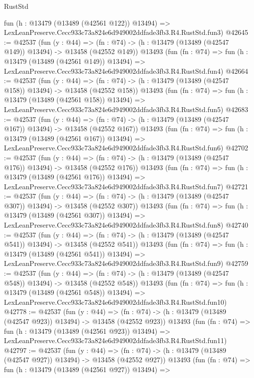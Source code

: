 \begin{lexlean}{RustStd}
\begin{coremodule}
    fun (h : @13479 (@13489 (@42561 @122)) @13494) =>
    LexLeanPreserve.Cecc933c73a824e6d949002ddfade3fb3.R4.RustStd.fun3)
@42645 := @42537
    (fun (y : @44) =>
    (fn : @74) -> (h : @13479 (@13489 (@42547 @149)) @13494) -> @13458 (@42552 @149))
    @13493
    (fun (fn : @74) =>
    fun (h : @13479 (@13489 (@42561 @149)) @13494) =>
    LexLeanPreserve.Cecc933c73a824e6d949002ddfade3fb3.R4.RustStd.fun4)
@42664 := @42537
    (fun (y : @44) =>
    (fn : @74) -> (h : @13479 (@13489 (@42547 @158)) @13494) -> @13458 (@42552 @158))
    @13493
    (fun (fn : @74) =>
    fun (h : @13479 (@13489 (@42561 @158)) @13494) =>
    LexLeanPreserve.Cecc933c73a824e6d949002ddfade3fb3.R4.RustStd.fun5)
@42683 := @42537
    (fun (y : @44) =>
    (fn : @74) -> (h : @13479 (@13489 (@42547 @167)) @13494) -> @13458 (@42552 @167))
    @13493
    (fun (fn : @74) =>
    fun (h : @13479 (@13489 (@42561 @167)) @13494) =>
    LexLeanPreserve.Cecc933c73a824e6d949002ddfade3fb3.R4.RustStd.fun6)
@42702 := @42537
    (fun (y : @44) =>
    (fn : @74) -> (h : @13479 (@13489 (@42547 @176)) @13494) -> @13458 (@42552 @176))
    @13493
    (fun (fn : @74) =>
    fun (h : @13479 (@13489 (@42561 @176)) @13494) =>
    LexLeanPreserve.Cecc933c73a824e6d949002ddfade3fb3.R4.RustStd.fun7)
@42721 := @42537
    (fun (y : @44) =>
    (fn : @74) -> (h : @13479 (@13489 (@42547 @307)) @13494) -> @13458 (@42552 @307))
    @13493
    (fun (fn : @74) =>
    fun (h : @13479 (@13489 (@42561 @307)) @13494) =>
    LexLeanPreserve.Cecc933c73a824e6d949002ddfade3fb3.R4.RustStd.fun8)
@42740 := @42537
    (fun (y : @44) =>
    (fn : @74) -> (h : @13479 (@13489 (@42547 @541)) @13494) -> @13458 (@42552 @541))
    @13493
    (fun (fn : @74) =>
    fun (h : @13479 (@13489 (@42561 @541)) @13494) =>
    LexLeanPreserve.Cecc933c73a824e6d949002ddfade3fb3.R4.RustStd.fun9)
@42759 := @42537
    (fun (y : @44) =>
    (fn : @74) -> (h : @13479 (@13489 (@42547 @548)) @13494) -> @13458 (@42552 @548))
    @13493
    (fun (fn : @74) =>
    fun (h : @13479 (@13489 (@42561 @548)) @13494) =>
    LexLeanPreserve.Cecc933c73a824e6d949002ddfade3fb3.R4.RustStd.fun10)
@42778 := @42537
    (fun (y : @44) =>
    (fn : @74) -> (h : @13479 (@13489 (@42547 @923)) @13494) -> @13458 (@42552 @923))
    @13493
    (fun (fn : @74) =>
    fun (h : @13479 (@13489 (@42561 @923)) @13494) =>
    LexLeanPreserve.Cecc933c73a824e6d949002ddfade3fb3.R4.RustStd.fun11)
@42797 := @42537
    (fun (y : @44) =>
    (fn : @74) -> (h : @13479 (@13489 (@42547 @927)) @13494) -> @13458 (@42552 @927))
    @13493
    (fun (fn : @74) =>
    fun (h : @13479 (@13489 (@42561 @927)) @13494) =>

\end{coremodule}
\end{lexlean}
